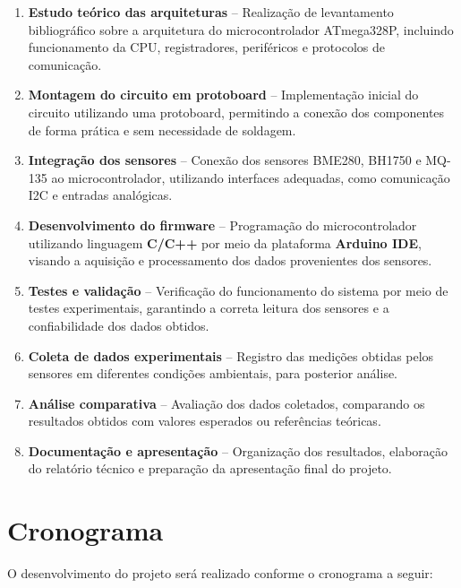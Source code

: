 \documentclass[a4paper,12pt]{article}
\begin{document}
\begin{enumerate}
    \item \textbf{Estudo teórico das arquiteturas} -- Realização de levantamento bibliográfico sobre a arquitetura do microcontrolador ATmega328P, incluindo funcionamento da CPU, registradores, periféricos e protocolos de comunicação.
    
    \item \textbf{Montagem do circuito em protoboard} -- Implementação inicial do circuito utilizando uma protoboard, permitindo a conexão dos componentes de forma prática e sem necessidade de soldagem.
    
    \item \textbf{Integração dos sensores} -- Conexão dos sensores BME280, BH1750 e MQ-135 ao microcontrolador, utilizando interfaces adequadas, como comunicação I2C e entradas analógicas.
    
    \item \textbf{Desenvolvimento do firmware} -- Programação do microcontrolador utilizando linguagem \textbf{C/C++} por meio da plataforma \textbf{Arduino IDE}, visando a aquisição e processamento dos dados provenientes dos sensores.
    
    \item \textbf{Testes e validação} -- Verificação do funcionamento do sistema por meio de testes experimentais, garantindo a correta leitura dos sensores e a confiabilidade dos dados obtidos.
    
    \item \textbf{Coleta de dados experimentais} -- Registro das medições obtidas pelos sensores em diferentes condições ambientais, para posterior análise.
    
    \item \textbf{Análise comparativa} -- Avaliação dos dados coletados, comparando os resultados obtidos com valores esperados ou referências teóricas.
    
    \item \textbf{Documentação e apresentação} -- Organização dos resultados, elaboração do relatório técnico e preparação da apresentação final do projeto.
\end{enumerate}

\section{Cronograma}
O desenvolvimento do projeto será realizado conforme o cronograma a seguir:
\end{document}
